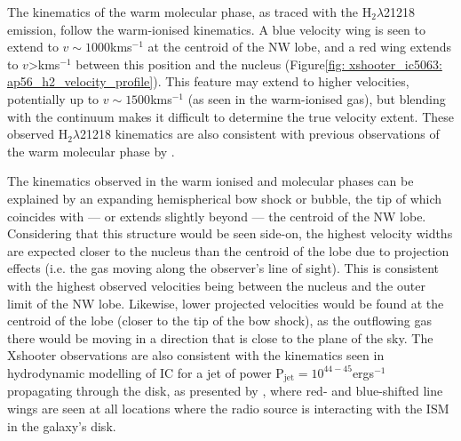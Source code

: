 The kinematics of the warm molecular phase, as traced with the H$_2\lambda$21218 emission, follow the warm-ionised kinematics. A blue velocity wing is seen to extend to $v\sim1000$\;km\;s$^{-1}$ at the centroid of the NW lobe, and a red wing extends to $v$\;\textgreater{}\;km\;s$^{-1}$ between this position and the nucleus (Figure\;\ref{fig: xshooter_ic5063: ap56_h2_velocity_profile}). This feature may extend to higher velocities, potentially up to $v\sim1500$\;km\;s$^{-1}$ (as seen in the warm-ionised gas), but blending with the continuum makes it difficult to determine the true velocity extent. These observed H$_2\lambda$21218 kinematics are also consistent with previous observations of the warm molecular phase by \citet{Tadhunter2014}.

The kinematics observed in the warm ionised and molecular phases can be explained by an expanding hemispherical bow shock or bubble, the tip of which coincides with --- or extends slightly beyond --- the centroid of the NW lobe. Considering that this structure would be seen side-on, the highest velocity widths are expected closer to the nucleus than the centroid of the lobe due to projection effects (i.e. the gas moving along the observer's line of sight). This is consistent with the highest observed velocities being between the nucleus and the outer limit of the NW lobe. Likewise, lower projected velocities would be found at the centroid of the lobe (closer to the tip of the bow shock), as the outflowing gas there would be moving in a direction that is close to the plane of the sky. The Xshooter observations are also consistent with the kinematics seen in hydrodynamic modelling of IC for a jet of power P$_\mathrm{jet}=10^{44-45}$\;erg\;s$^{-1}$ propagating through the disk, as presented by \citet{Mukherjee2018}, where red- and blue-shifted line wings are seen at all locations where the radio source is interacting with the ISM in the galaxy's disk.

